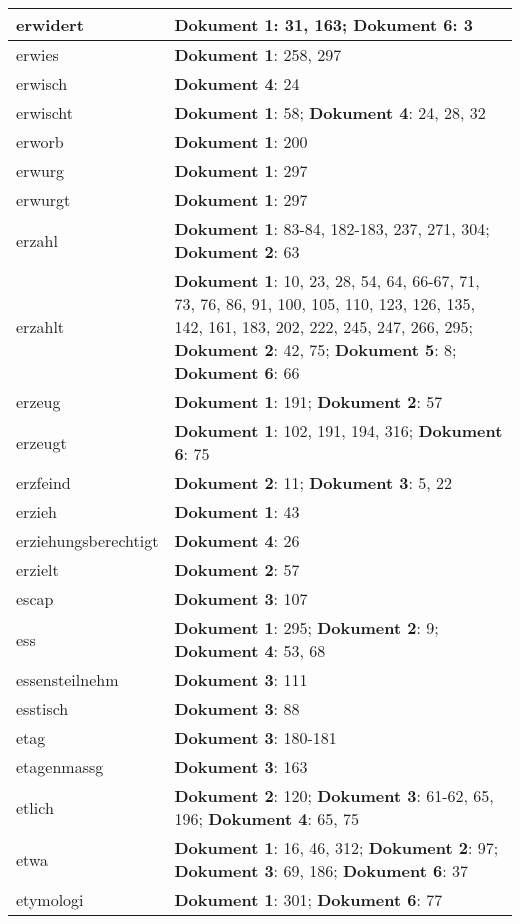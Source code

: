 \documentclass[a5paper]{article}
\begin{document}
\begin{longtable}[l]{|l|p{3in}|}
\hline
erwidert & \textbf{Dokument 1}: 31, 163; \textbf{Dokument 6}: 3 \\
\hline
erwies & \textbf{Dokument 1}: 258, 297 \\
\hline
erwisch & \textbf{Dokument 4}: 24 \\
\hline
erwischt & \textbf{Dokument 1}: 58; \textbf{Dokument 4}: 24, 28, 32 \\
\hline
erworb & \textbf{Dokument 1}: 200 \\
\hline
erwurg & \textbf{Dokument 1}: 297 \\
\hline
erwurgt & \textbf{Dokument 1}: 297 \\
\hline
erzahl & \textbf{Dokument 1}: 83-84, 182-183, 237, 271, 304; \textbf{Dokument 2}: 63 \\
\hline
erzahlt & \textbf{Dokument 1}: 10, 23, 28, 54, 64, 66-67, 71, 73, 76, 86, 91, 100, 105, 110, 123, 126, 135, 142, 161, 183, 202, 222, 245, 247, 266, 295; \textbf{Dokument 2}: 42, 75; \textbf{Dokument 5}: 8; \textbf{Dokument 6}: 66 \\
\hline
erzeug & \textbf{Dokument 1}: 191; \textbf{Dokument 2}: 57 \\
\hline
erzeugt & \textbf{Dokument 1}: 102, 191, 194, 316; \textbf{Dokument 6}: 75 \\
\hline
erzfeind & \textbf{Dokument 2}: 11; \textbf{Dokument 3}: 5, 22 \\
\hline
erzieh & \textbf{Dokument 1}: 43 \\
\hline
erziehungsberechtigt & \textbf{Dokument 4}: 26 \\
\hline
erzielt & \textbf{Dokument 2}: 57 \\
\hline
escap & \textbf{Dokument 3}: 107 \\
\hline
ess & \textbf{Dokument 1}: 295; \textbf{Dokument 2}: 9; \textbf{Dokument 4}: 53, 68 \\
\hline
essensteilnehm & \textbf{Dokument 3}: 111 \\
\hline
esstisch & \textbf{Dokument 3}: 88 \\
\hline
etag & \textbf{Dokument 3}: 180-181 \\
\hline
etagenmassg & \textbf{Dokument 3}: 163 \\
\hline
etlich & \textbf{Dokument 2}: 120; \textbf{Dokument 3}: 61-62, 65, 196; \textbf{Dokument 4}: 65, 75 \\
\hline
etwa & \textbf{Dokument 1}: 16, 46, 312; \textbf{Dokument 2}: 97; \textbf{Dokument 3}: 69, 186; \textbf{Dokument 6}: 37 \\
\hline
etymologi & \textbf{Dokument 1}: 301; \textbf{Dokument 6}: 77 \\

\end{longtable}
\end{document}
